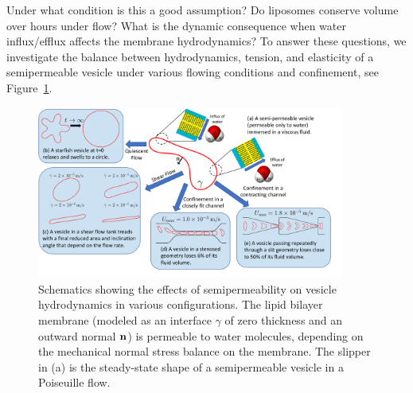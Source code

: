 \documentclass[9pt,twocolumn,twoside,lineno]{pnas-new}
\begin{document}
Under what condition is this a good assumption? Do liposomes conserve
volume over hours under flow? What is the dynamic consequence when water
influx/efflux affects the membrane hydrodynamics? To answer these
questions, we investigate the balance between hydrodynamics, tension,
and elasticity of a semipermeable vesicle under various flowing
conditions and confinement, see Figure~\ref{fig:sketch}.
%
\begin{figure}[htp]
  \centering
  \includegraphics[width=0.9\textwidth]{figures/schematic.pdf}
  \caption{\label{fig:sketch} Schematics showing the effects of
  semipermeability on vesicle hydrodynamics in various configurations. 
  The lipid bilayer membrane (modeled as an interface $\gamma$ of zero
  thickness and an outward normal $\mathbf{n}$) is permeable to water
  molecules, depending on the mechanical normal stress balance on the
  membrane.  The slipper in (a) is the steady-state shape of a
  semipermeable vesicle in a Poiseuille flow.}
\end{figure}
%
\end{document}
